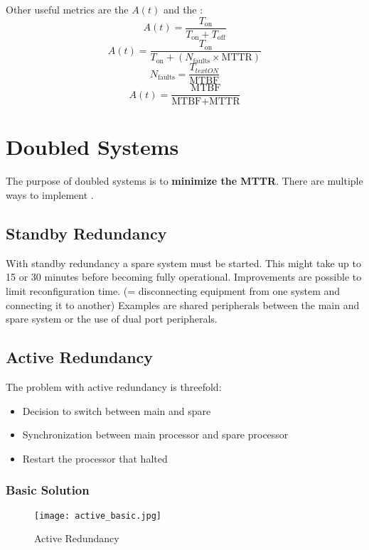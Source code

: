\documentclass[../main.tex]{subfiles}
\begin{document}
Other useful metrics are the  $A(t)$ and the :
\[
A(t) = \frac{T_{\text{on}}}{T_{\text{on}} + T_{\text{off}}}
\]
\[
A(t) = \frac{T_{\text{on}}}{T_{\text{on}} + (N_{\text{faults}} \times \text{MTTR})}
\]
\[
N_{\text{faults}} = \frac{T_{text{ON}}}{\text{MTBF}}
\]
\[
A(t) = \frac{\text{MTBF}}{\text{MTBF} + \text{MTTR}}
\]
\section{Doubled Systems}
The purpose of doubled systems is to \textbf{minimize the MTTR}. There are multiple ways to implement .

\subsection{Standby Redundancy}
With standby redundancy a spare system must be started. This might take up to 15 or 30 minutes before becoming fully operational. Improvements are possible to limit reconfiguration time. (= disconnecting equipment from one system and connecting it to another) Examples are shared peripherals between the main and spare system or the use of dual port peripherals.

\subsection{Active Redundancy}
The problem with active redundancy is threefold:
\begin{itemize}
	\item Decision to switch between main and spare
	\item Synchronization between main processor and spare processor
	\item Restart the processor that halted
\end{itemize}



\subsubsection{Basic Solution}
\begin{figure}[h!]
    \centering
    \texttt{[image: active\_basic.jpg]}
    \caption{Active Redundancy}
    \label{acre}
\end{figure}
\end{document}
